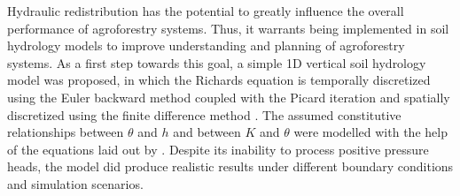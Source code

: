 Hydraulic redistribution has the potential to greatly influence the overall performance of agroforestry systems.
Thus, it warrants being implemented in soil hydrology models to improve understanding and planning of agroforestry systems.
As a first step towards this goal, a simple 1D vertical soil hydrology model was proposed, in which the Richards equation \parencite{richards_capillary_1931} is temporally discretized using the Euler backward method coupled with the Picard iteration and spatially discretized using the finite difference method \parencite{celia_general_1990}.
The assumed constitutive relationships between $\theta$ and $h$ and between $K$ and $\theta$ were modelled with the help of the equations laid out by \textcite{genuchten_closed-form_1980}.
Despite its inability to process positive pressure heads, the model did produce realistic results under different boundary conditions and simulation scenarios.

